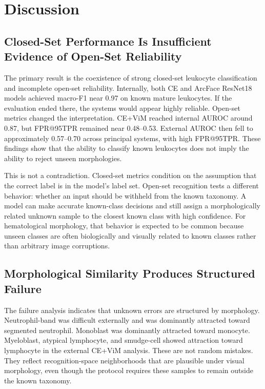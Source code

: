 \section{Discussion}

\subsection{Closed-Set Performance Is Insufficient Evidence of Open-Set Reliability}

The primary result is the coexistence of strong closed-set leukocyte classification and incomplete open-set reliability. Internally, both CE and ArcFace ResNet18 models achieved macro-F1 near 0.97 on known mature leukocytes. If the evaluation ended there, the systems would appear highly reliable. Open-set metrics changed the interpretation. CE+ViM reached internal AUROC around 0.87, but FPR@95TPR remained near 0.48--0.53. External AUROC then fell to approximately 0.57--0.70 across principal systems, with high FPR@95TPR. These findings show that the ability to classify known leukocytes does not imply the ability to reject unseen morphologies.

This is not a contradiction. Closed-set metrics condition on the assumption that the correct label is in the model's label set. Open-set recognition tests a different behavior: whether an input should be withheld from the known taxonomy. A model can make accurate known-class decisions and still assign a morphologically related unknown sample to the closest known class with high confidence. For hematological morphology, that behavior is expected to be common because unseen classes are often biologically and visually related to known classes rather than arbitrary image corruptions.

\subsection{Morphological Similarity Produces Structured Failure}

The failure analysis indicates that unknown errors are structured by morphology. Neutrophil-band was difficult externally and was dominantly attracted toward segmented neutrophil. Monoblast was dominantly attracted toward monocyte. Myeloblast, atypical lymphocyte, and smudge-cell showed attraction toward lymphocyte in the external CE+ViM analysis. These are not random mistakes. They reflect recognition-space neighborhoods that are plausible under visual morphology, even though the protocol requires these samples to remain outside the known taxonomy.


